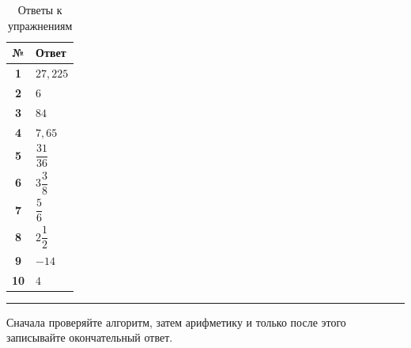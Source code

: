 \documentclass[a4paper,12pt]{article}
\begin{document}
\begin{table}[ht]
    \centering
    \caption{Ответы к упражнениям}
    \begin{tabularx}{\linewidth}{@{}>{\bfseries}c X@{}}
        \toprule
        № & Ответ \\
        \midrule
        1 & \(27{,}225\) \\
        2 & \(6\) \\
        3 & \(84\) \\
        4 & \(7{,}65\) \\
        5 & \(\dfrac{31}{36}\) \\
        6 & \(3\dfrac38\) \\
        7 & \(\dfrac56\) \\
        8 & \(2\dfrac12\) \\
        9 & \(-14\) \\
        10 & \(4\) \\
        \bottomrule
    \end{tabularx}
\end{table}

\vfill

\begin{center}
    {\color{accent}\rule{0.55\linewidth}{0.7pt}}

    \vspace{0.6em}

    {\small\color{textgray}
    Сначала проверяйте алгоритм, затем арифметику и только после этого
    записывайте окончательный ответ.}
\end{center}
\end{document}

